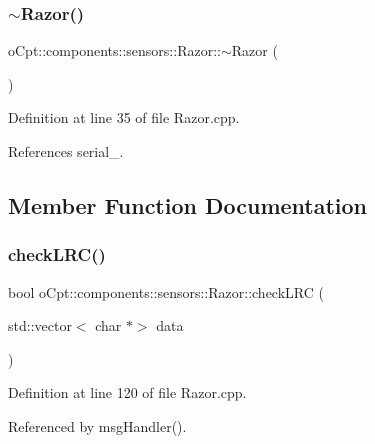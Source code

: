 \subsubsection{\texorpdfstring{$\sim$\+Razor()}{~Razor()}}
{\footnotesize\ttfamily o\+Cpt\+::components\+::sensors\+::\+Razor\+::$\sim$\+Razor (\begin{DoxyParamCaption}{ }\end{DoxyParamCaption})}



Definition at line 35 of file Razor.\+cpp.



References serial\+\_\+.



\subsection{Member Function Documentation}
\hypertarget{classo_cpt_1_1components_1_1sensors_1_1_razor_a0905dcac63406a3885fa8c2d0e952a39}{}\label{classo_cpt_1_1components_1_1sensors_1_1_razor_a0905dcac63406a3885fa8c2d0e952a39} 
\subsubsection{\texorpdfstring{check\+L\+R\+C()}{checkLRC()}}
{\footnotesize\ttfamily bool o\+Cpt\+::components\+::sensors\+::\+Razor\+::check\+L\+RC (\begin{DoxyParamCaption}\item[{std\+::vector$<$ char $\ast$$>$}]{data }\end{DoxyParamCaption})\hspace{0.3cm}{\ttfamily [private]}}



Definition at line 120 of file Razor.\+cpp.



Referenced by msg\+Handler().

